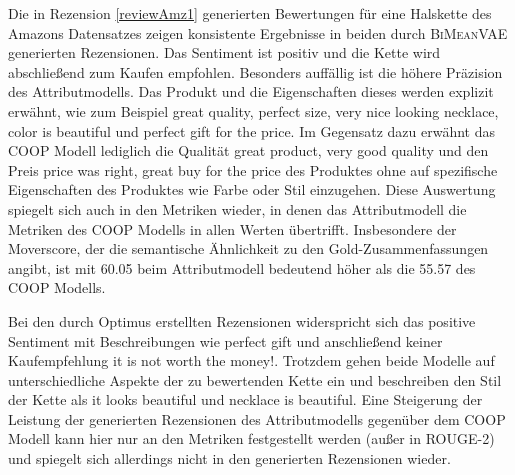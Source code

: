 Die in Rezension \ref{reviewAmz1} generierten Bewertungen für eine Halskette des Amazons Datensatzes zeigen konsistente Ergebnisse in beiden durch \textsc{BiMeanVAE} generierten Rezensionen. 
Das Sentiment ist positiv und die Kette wird abschließend zum Kaufen empfohlen. Besonders auffällig ist die höhere Präzision des Attributmodells. Das Produkt und die Eigenschaften dieses werden explizit erwähnt, wie zum Beispiel \glqq{}great quality\grqq{}, \glqq{}perfect size\grqq{}, \glqq{}very nice looking necklace\grqq{}, \glqq{}color is beautiful\grqq{} und \glqq{}perfect gift for the price\grqq{}.
Im Gegensatz dazu erwähnt das COOP Modell lediglich die Qualität \glqq{}great product\grqq{}, \glqq{}very good quality\grqq{} und den Preis \glqq{}price was right\grqq{}, \glqq{}great buy for the price\grqq{} des Produktes ohne auf spezifische Eigenschaften des Produktes wie Farbe oder Stil einzugehen.
Diese Auswertung spiegelt sich auch in den Metriken wieder, in denen das Attributmodell die Metriken des COOP Modells in allen Werten übertrifft. 
Insbesondere der Moverscore, der die semantische Ähnlichkeit zu den Gold-Zusammenfassungen angibt, ist mit 60.05 beim Attributmodell bedeutend höher als die 55.57 des COOP Modells.

Bei den durch Optimus erstellten Rezensionen widerspricht sich das positive Sentiment mit Beschreibungen wie \glqq{}perfect gift\grqq{} und anschließend keiner Kaufempfehlung \glqq{}it is not worth the money!\grqq{}.
Trotzdem gehen beide Modelle auf unterschiedliche Aspekte der zu bewertenden Kette ein und beschreiben den Stil der Kette als \glqq{}it looks beautiful\grqq{} und \glqq{}necklace is beautiful\grqq{}.
Eine Steigerung der Leistung der generierten Rezensionen des Attributmodells gegenüber dem COOP Modell kann hier nur an den Metriken festgestellt werden (außer in ROUGE-2) und spiegelt sich allerdings nicht in den generierten Rezensionen wieder.


